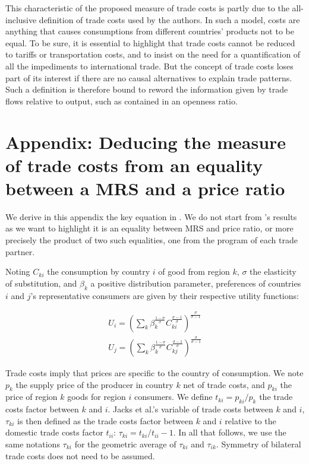 \documentclass{article}
\begin{document}
This characteristic of the proposed measure of trade costs is
partly due to the all-inclusive definition of trade
costs used by the authors. In such a model, costs are anything
that causes consumptions from different countries' products not
to be equal. To be sure, it is essential to highlight that
trade costs cannot be reduced to tariffs or transportation
costs, and to insist on the need for a quantification of all
the impediments to international trade. But the concept of
trade costs loses part of its interest if there are no causal
alternatives to explain trade patterns. Such a definition is
therefore bound to reword the information given by trade
flows relative to output, such as contained in an openness
ratio.

\appendix

\section{\label{A1}Appendix: Deducing the measure of trade costs from an equality between a MRS and a price ratio}

We derive in this appendix the key equation in \cite{JMN2011}.
We do not start from \cite{AW2003}'s results as we want to
highlight it is an equality between MRS and price ratio, or
more precisely the product of two such equalities, one from the
program of each trade partner.

Noting $C_{ki}$ the consumption by country $i$ of good from
region $k$, $\sigma$ the elasticity of substitution, and
$\beta_k$ a positive distribution parameter, preferences of
countries $i$ and $j$'s representative consumers are given by
their respective utility functions:

\begin{eqnarray*}
U_i=\left(\sum_k\beta_{k}^{\frac{1-\sigma}{\sigma}}C_{ki}^{\frac{\sigma-1}{\sigma}}\right)^{\frac{\sigma}{\sigma-1}}\\
U_j=\left(\sum_k\beta_{k}^{\frac{1-\sigma}{\sigma}}C_{kj}^{\frac{\sigma-1}{\sigma}}\right)^{\frac{\sigma}{\sigma-1}}
\end{eqnarray*}

Trade costs imply that prices are specific to the country of
consumption. We note $p_k$ the supply price of the producer in
country $k$ net of trade costs, and $p_{ki}$ the price of
region $k$ goods for region $i$ consumers. We define
$t_{ki}=p_{ki}/p_{k}$ the trade costs factor between $k$ and
$i$. Jacks et al.'s variable of trade costs between $k$ and
$i$, $\tau_{ki}$ is then defined as the trade costs factor
between $k$ and $i$ relative to the domestic trade costs factor
$t_{ii}$: $\tau_{ki}=t_{ki}/t_{ii}-1$. In all that follows, we
use the same notations $\tau_{ki}$ for the geometric average of
$\tau_{ki}$ and $\tau_{ik}$. Symmetry of bilateral trade costs
does not need to be assumed.
\end{document}
